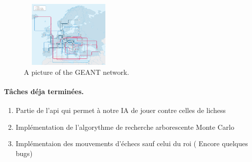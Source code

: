 \documentclass{article}
\begin{document}
\begin{figure}[h]
  \label{fig:geant}
  \hrulefill
  \begin{center}
  \includegraphics[height=123px,width=180px]{geant}
  \end{center}
  \caption{A picture of the GEANT network.}
  \hrulefill
\end{figure}
\paragraph{Tâches déja terminées.}

\begin{enumerate}

  \item Partie de l'api qui permet à notre IA de jouer contre celles de lichess
  \item Implémentation de l'algorythme de recherche arborescente Monte Carlo
  \item Implémentaion des mouvements d'échecs sauf celui du roi ( Encore quelques bugs)
\end{enumerate}
\end{document}
